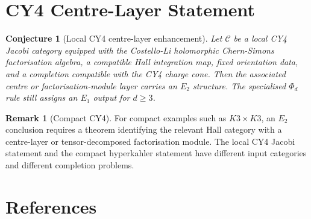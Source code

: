\documentclass[11pt]{article}
\newtheorem{conjecture}[theorem]{Conjecture}
\theoremstyle{definition}
\newtheorem{remark}[theorem]{Remark}
\providecommand{\cC}{\mathcal{C}}
\providecommand{\Eone}{E_1}
\providecommand{\Etwo}{E_2}
\begin{document}
\section{CY4 Centre-Layer Statement}

\begin{conjecture}[Local CY4 centre-layer enhancement]
\label{conj:cy4-centre-layer}
Let $\cC$ be a local CY4 Jacobi category equipped with the Costello-Li
holomorphic Chern-Simons factorisation algebra, a compatible Hall
integration map, fixed orientation data, and a completion compatible with
the CY4 charge cone.  Then the associated centre or factorisation-module
layer carries an $\Etwo$ structure.  The specialised $\Phi_d$ rule still
assigns an $\Eone$ output for $d\geq 3$.
\end{conjecture}

\begin{remark}[Compact CY4]
For compact examples such as $K3\times K3$, an $\Etwo$ conclusion
requires a theorem identifying the relevant Hall category with a
centre-layer or tensor-decomposed factorisation module.  The local CY4
Jacobi statement and the compact hyperkahler statement have different
input categories and different completion problems.
\end{remark}

\section*{References}
\end{document}
